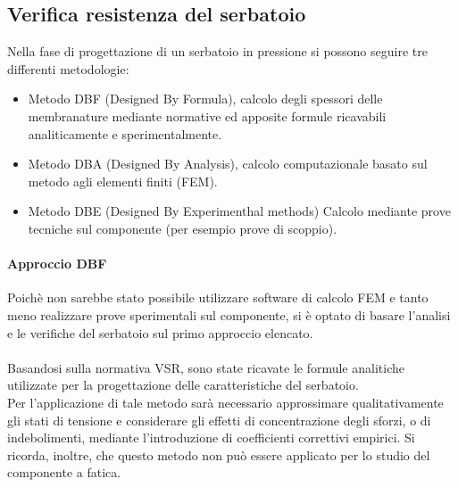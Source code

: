 \subsection{Verifica resistenza del serbatoio}
Nella fase di progettazione di un serbatoio in pressione si possono seguire tre differenti metodologie:
\begin{itemize}
    \item Metodo DBF (Designed By Formula), calcolo degli spessori delle membranature mediante normative ed apposite formule ricavabili analiticamente e sperimentalmente. 
    \item Metodo DBA (Designed By Analysis), calcolo computazionale basato sul metodo agli elementi finiti (FEM).
    \item Metodo DBE (Designed By Experimenthal methods) Calcolo mediante prove tecniche sul componente (per esempio prove di scoppio). 
\end{itemize}
\paragraph{Approccio DBF} Poichè non sarebbe stato possibile utilizzare software di calcolo FEM e tanto meno realizzare prove sperimentali sul componente, si è optato di basare l'analisi e le verifiche del serbatoio sul primo approccio elencato. \\
\\
Basandosi sulla normativa VSR, sono state ricavate le formule analitiche utilizzate per la progettazione delle caratteristiche del serbatoio. \\
Per l'applicazione di tale metodo sarà necessario approssimare qualitativamente gli stati di tensione e considerare gli effetti di concentrazione degli sforzi, o di indebolimenti, mediante l'introduzione di coefficienti correttivi empirici. Si ricorda, inoltre, che questo metodo non può essere applicato per lo studio del componente a fatica.
